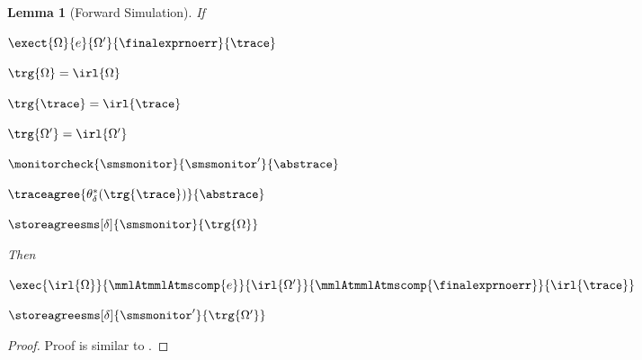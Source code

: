 \documentclass[a4paper,names,dvipsnames]{article}
\newtheorem{lemma}{Lemma}
\begin{document}
\begin{lemma}[Forward Simulation]\label{lem:sms:forwardsim}
  If
  \begin{assumptions}
    \item $\exect{\Omega}{e}{\Omega'}{\finalexprnoerr}{\trace}$
    \item $\trg{\Omega}=\irl{\Omega}$
    \item $\trg{\trace}=\irl{\trace}$
    \item $\trg{\Omega'}=\irl{\Omega'}$
    \item $\monitorcheck{\smsmonitor}{\smsmonitor'}{\abstrace}$
    \item $\traceagree{\theta_{\delta}^{*}(\trg{\trace})}{\abstrace}$
    \item $\storeagreesms[\delta]{\smsmonitor}{\trg{\Omega}}$
  \end{assumptions}
  Then
  \begin{goals}
    \item $\exec{\irl{\Omega}}{\mmlAtmmlAtmscomp{e}}{\irl{\Omega'}}{\mmlAtmmlAtmscomp{\finalexprnoerr}}{\irl{\trace}}$
    \item $\storeagreesms[\delta]{\smsmonitor'}{\trg{\Omega'}}$
  \end{goals}
\end{lemma}
\begin{proof}
  Proof is similar to .
\end{proof}
\end{document}
